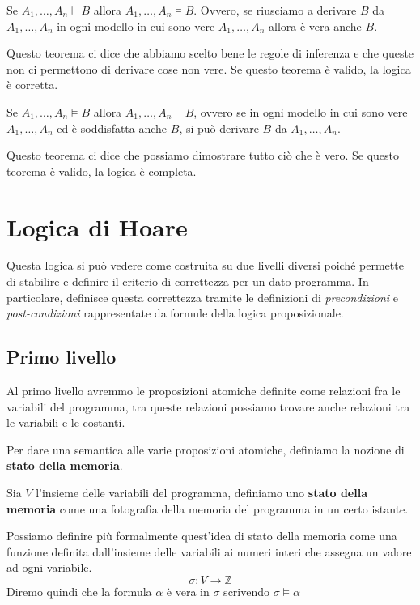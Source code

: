 \begin{teorema}
    Se $A_1, \dots, A_n \vdash B$ allora $A_1, \dots, A_n \models B$. Ovvero, se
    riusciamo a derivare $B$ da $A_1, \dots, A_n$ in ogni modello in cui sono
    vere $A_1, \dots, A_n$ allora è vera anche $B$.
\end{teorema}
Questo teorema ci dice che abbiamo scelto bene le regole di inferenza e che
queste non ci permettono di derivare cose non vere. Se questo teorema è valido,
la logica è corretta.
\begin{teorema}
    Se $A_1, \dots, A_n \models B$ allora $A_1, \dots, A_n \vdash B$, ovvero se
    in ogni modello in cui sono vere $A_1, \dots, A_n$ ed è soddisfatta anche
    $B$, si può derivare $B$ da $A_1, \dots, A_n$.
\end{teorema}
Questo teorema ci dice che possiamo dimostrare tutto ciò che è vero. Se questo
teorema è valido, la logica è completa.
\section{Logica di Hoare}
Questa logica si può vedere come costruita su due livelli diversi poiché permette
di stabilire e definire il criterio di correttezza per un dato programma.
In particolare, definisce questa correttezza tramite le definizioni di
\textit{precondizioni} e \textit{post-condizioni} rappresentate da formule della
logica proposizionale.
\subsection{Primo livello}
Al primo livello avremmo le proposizioni atomiche definite come relazioni fra le
variabili del programma, tra queste relazioni possiamo trovare anche relazioni
tra le variabili e le costanti.

Per dare una semantica alle varie proposizioni atomiche, definiamo la nozione di
\textbf{stato della memoria}.
\begin{definizione}
    Sia $V$ l'insieme delle variabili del programma, definiamo uno \textbf{stato
        della memoria} come una fotografia della memoria del programma in un
    certo istante.

    Possiamo definire più formalmente quest'idea di stato della memoria come una
    funzione definita dall'insieme delle variabili ai numeri interi che assegna
    un valore ad ogni variabile.
    \begin{equation}
        \sigma: V \to \mathbb{Z}
    \end{equation}
    Diremo quindi che la formula $\alpha$ è vera in $\sigma$ scrivendo $\sigma
        \models \alpha$
\end{definizione}
